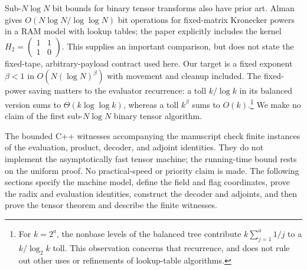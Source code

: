 Sub-$N\log N$ bit bounds for binary tensor transforms also have prior art. Alman~\cite[Section~1.1, Section~1.2 and footnote~4]{Alman23} gives $O(N\log N/\log\log N)$ bit operations for fixed-matrix Kronecker powers in a RAM model with lookup tables; the paper explicitly includes the kernel $H_2=\left(\begin{smallmatrix}1&1\\1&0\end{smallmatrix}\right)$. This supplies an important comparison, but does not state the fixed-tape, arbitrary-payload contract used here. Our target is a fixed exponent $\beta<1$ in $O(N(\log N)^\beta)$ with movement and cleanup included. The fixed-power saving matters to the evaluator recurrence: a toll $k/\log k$ in its balanced version sums to $\Theta(k\log\log k)$, whereas a toll $k^\beta$ sums to $O(k)$.\footnote{For $k=2^a$, the nonbase levels of the balanced tree contribute $k\sum_{j=1}^a 1/j$ to a $k/\log_2 k$ toll. This observation concerns that recurrence, and does not rule out other uses or refinements of lookup-table algorithms.} We make no claim of the first sub-$N\log N$ binary tensor algorithm.

The bounded C++ witnesses accompanying the manuscript check finite instances of the evaluation, product, decoder, and adjoint identities. They do not implement the asymptotically fast tensor machine; the running-time bound rests on the uniform proof. No practical-speed or priority claim is made. The following sections specify the machine model, define the field and flag coordinates, prove the radix and evaluation identities, construct the decoder and adjoints, and then prove the tensor theorem and describe the finite witnesses.

